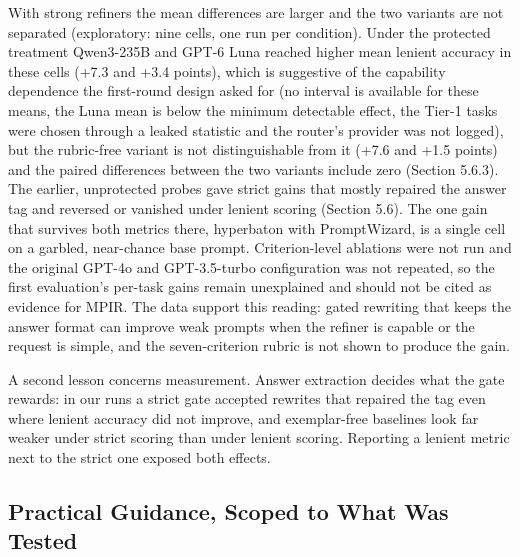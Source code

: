 \documentclass{ieeeaccess}
\begin{document}
With strong refiners the mean differences are larger and the two variants are not separated (exploratory: nine cells, one run per condition). Under the protected treatment Qwen3-235B and GPT-6 Luna reached higher mean lenient accuracy in these cells (+7.3 and +3.4 points), which is suggestive of the capability dependence the first-round design asked for (no interval is available for these means, the Luna mean is below the minimum detectable effect, the Tier-1 tasks were chosen through a leaked statistic and the router's provider was not logged), but the rubric-free variant is not distinguishable from it (+7.6 and +1.5 points) and the paired differences between the two variants include zero (Section 5.6.3). The earlier, unprotected probes gave strict gains that mostly repaired the answer tag and reversed or vanished under lenient scoring (Section 5.6). The one gain that survives both metrics there, hyperbaton with PromptWizard, is a single cell on a garbled, near-chance base prompt. Criterion-level ablations were not run and the original GPT-4o and GPT-3.5-turbo configuration was not repeated, so the first evaluation's per-task gains remain unexplained and should not be cited as evidence for MPIR. The data support this reading: gated rewriting that keeps the answer format can improve weak prompts when the refiner is capable or the request is simple, and the seven-criterion rubric is not shown to produce the gain.

A second lesson concerns measurement. Answer extraction decides what the gate rewards: in our runs a strict gate accepted rewrites that repaired the tag even where lenient accuracy did not improve, and exemplar-free baselines look far weaker under strict scoring than under lenient scoring. Reporting a lenient metric next to the strict one exposed both effects.

\subsection{Practical Guidance, Scoped to What Was Tested}
\end{document}
